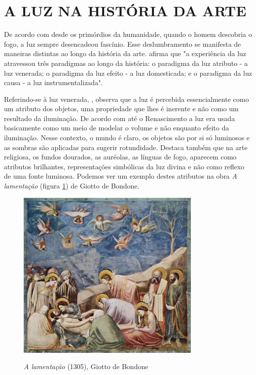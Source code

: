 \section{A LUZ NA HISTÓRIA DA ARTE}

De acordo com   desde os primórdios da humanidade, quando o homem descobria o fogo, a luz sempre desencadeou fascínio. Esse deslumbramento se manifesta de maneiras distintas ao longo da história da arte.  afirma que "a experiência da luz atravessou três paradigmas ao longo da história: o paradigma da luz atributo - a luz venerada; o paradigma da luz efeito - a luz domesticada; e o paradigma da luz causa - a luz instrumentalizada".

Referindo-se à luz venerada, , observa que a luz é percebida essencialmente como um atributo dos objetos, uma propriedade que lhes é inerente e não como um resultado da iluminação. De acordo com  até o Renascimento a luz era usada basicamente como um meio de modelar o volume e não enquanto efeito da iluminação. Nesse contexto, o mundo é claro, os objetos são por si só luminosos e as sombras são aplicadas para sugerir rotundidade. Destaca também que na arte religiosa, os fundos dourados, as auréolas, as línguas de fogo, aparecem como atributos brilhantes, representações simbólicas da luz divina e não como reflexo de uma fonte luminosa. Podemos ver um exemplo destes atributos na obra \textit{A lamentação} (figura \ref{fig:giotto_lamentacao}) de Giotto de Bondone.

\begin{figure}[H]
    \centering
    \caption{\textit{A lamentação} (1305), Giotto de Bondone}
	\vspace*{0,2cm}
    \includegraphics[width=0.8\textwidth]{./04-figuras/giotto_lamentacao}
    \label{fig:giotto_lamentacao}
\end{figure}
\vspace*{-0,9cm}
{\raggedright {}}\\

